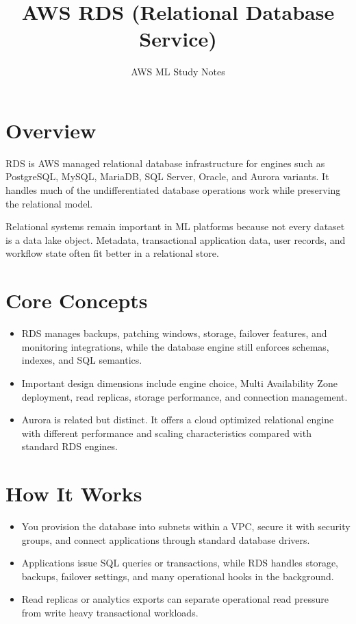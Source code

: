 \documentclass[10pt,twocolumn]{article}
\begin{document}
\title{\vspace{-1.6cm}AWS RDS (Relational Database Service)}
\author{AWS ML Study Notes}
\date{}
\maketitle
\small

\section*{Overview}
RDS is AWS managed relational database infrastructure for engines such as PostgreSQL, MySQL, MariaDB, SQL Server, Oracle, and Aurora variants. It handles much of the undifferentiated database operations work while preserving the relational model.

Relational systems remain important in ML platforms because not every dataset is a data lake object. Metadata, transactional application data, user records, and workflow state often fit better in a relational store.

\section*{Core Concepts}
\begin{itemize}
\item RDS manages backups, patching windows, storage, failover features, and monitoring integrations, while the database engine still enforces schemas, indexes, and SQL semantics.
\item Important design dimensions include engine choice, Multi Availability Zone deployment, read replicas, storage performance, and connection management.
\item Aurora is related but distinct. It offers a cloud optimized relational engine with different performance and scaling characteristics compared with standard RDS engines.
\end{itemize}

\section*{How It Works}
\begin{itemize}
\item You provision the database into subnets within a VPC, secure it with security groups, and connect applications through standard database drivers.
\item Applications issue SQL queries or transactions, while RDS handles storage, backups, failover settings, and many operational hooks in the background.
\item Read replicas or analytics exports can separate operational read pressure from write heavy transactional workloads.
\end{itemize}
\end{document}
